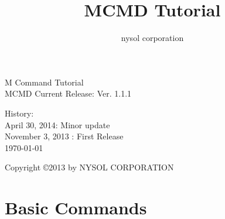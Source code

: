 \documentclass[a4paper]{book}
\title{MCMD Tutorial}
\author{nysol corporation}
\date{}
\begin{document}
\begin{titlepage}
\begin{center}
{\huge M Command Tutorial}\\
\vspace{10truept}
{\normalsize MCMD Current Release: Ver. 1.1.1}\\

\vspace{1cm}

History:\\
April 30, 2014: Minor update\\
November 3, 2013 : First Release\\
\vspace{20cm}
{\small \today}

{\small Copyright \copyright 2013 by NYSOL CORPORATION}

\end{center}
\end{titlepage}

\setcounter{tocdepth}{1}
\tableofcontents

\chapter{Basic Commands}
















\printindex
\end{document}
